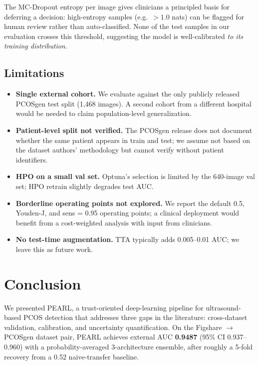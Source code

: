 \documentclass[11pt,twocolumn]{article}
\newcommand{\PCOS}{PCOS}
\newcommand{\PEARL}{PEARL}
\newcommand{\AUC}{AUC}
\begin{document}
The MC-Dropout entropy per image gives clinicians a principled basis for
deferring a decision: high-entropy samples (e.g.\ $> 1.0$ nats) can be
flagged for human review rather than auto-classified. None of the test
samples in our evaluation crosses this threshold, suggesting the model
is well-calibrated \emph{to its training distribution}.

\subsection{Limitations}

\begin{itemize}[leftmargin=*,noitemsep,topsep=2pt]
  \item \textbf{Single external cohort.} We evaluate against the only
        publicly released \PCOS{}gen test split (1,468 images). A second
        cohort from a different hospital would be needed to claim
        population-level generalization.
  \item \textbf{Patient-level split not verified.} The \PCOS{}gen release
        does not document whether the same patient appears in train and
        test; we assume not based on the dataset authors' methodology but
        cannot verify without patient identifiers.
  \item \textbf{HPO on a small val set.} Optuna's selection is limited by
        the 640-image val set; HPO retrain slightly degrades test \AUC{}.
  \item \textbf{Borderline operating points not explored.} We report the
        default 0.5, Youden-J, and sens = 0.95 operating points; a
        clinical deployment would benefit from a cost-weighted analysis
        with input from clinicians.
  \item \textbf{No test-time augmentation.} TTA typically adds
        0.005--0.01 \AUC{}; we leave this as future work.
\end{itemize}

\section{Conclusion}

We presented \PEARL{}, a trust-oriented deep-learning pipeline for
ultrasound-based \PCOS{} detection that addresses three gaps in the
literature: cross-dataset validation, calibration, and uncertainty
quantification. On the Figshare $\rightarrow$ \PCOS{}gen dataset pair,
\PEARL{} achieves external \AUC{} \textbf{0.9487} (95\% CI 0.937--0.960)
with a probability-averaged 3-architecture ensemble, after roughly a
5-fold recovery from a 0.52 naive-transfer baseline.
\end{document}
